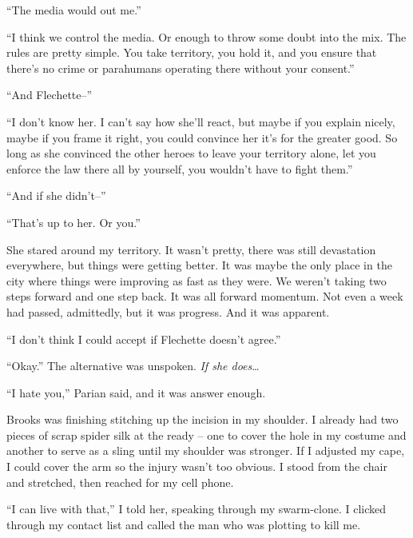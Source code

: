 ``The media would out me.''



``I think we control the media.  Or enough to throw some doubt into the mix.  The rules are pretty simple.  You take territory, you hold it, and you ensure that there's no crime or parahumans operating there without your consent.''



``And Flechette--''



``I don't know her.  I can't say how she'll react, but maybe if you explain nicely, maybe if you frame it right, you could convince her it's for the greater good.  So long as she convinced the other heroes to leave your territory alone, let you enforce the law there all by yourself, you wouldn't have to fight them.''



``And if she didn't--''



``That's up to her.  Or you.''



She stared around my territory.  It wasn't pretty, there was still devastation everywhere, but things were getting better.  It was maybe the only place in the city where things were improving as fast as they were.  We weren't taking two steps forward and one step back.  It was all forward momentum.  Not even a week had passed, admittedly, but it was progress.  And it was apparent.



``I don't think I could accept if Flechette doesn't agree.''



``Okay.''  The alternative was unspoken.  \emph{If she does}\ldots



``I hate you,'' Parian said, and it was answer enough.



Brooks was finishing stitching up the incision in my shoulder.  I already had two pieces of scrap spider silk at the ready – one to cover the hole in my costume and another to serve as a sling until my shoulder was stronger.  If I adjusted my cape, I could cover the arm so the injury wasn't too obvious.  I stood from the chair and stretched, then reached for my cell phone.



``I can live with that,'' I told her, speaking through my swarm-clone.  I clicked through my contact list and called the man who was plotting to kill me.





